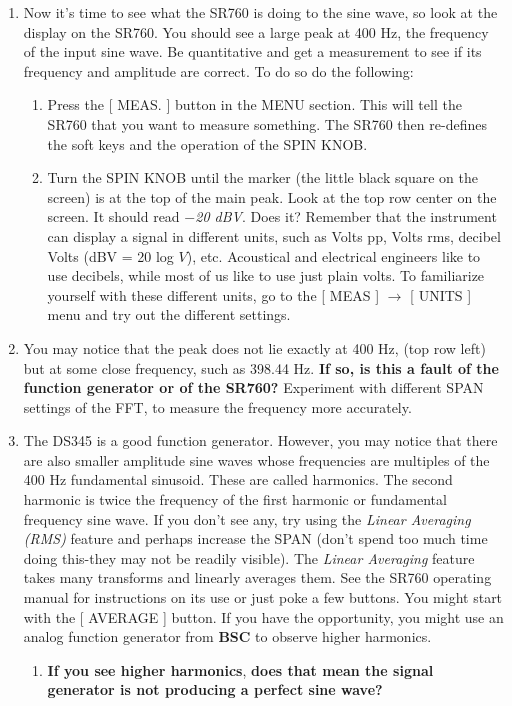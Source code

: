 \documentclass{../lab}
\begin{document}
\begin{enumerate}
\begin{enumerate}
\begin{enumerate}
        \end{enumerate}

    \end{enumerate}

    \item Now it's time to see what the SR760 is doing to the sine wave, so look at the display on the SR760. You should see a large peak at 400 Hz, the frequency of the input sine wave. Be quantitative and get a measurement to see if its frequency and amplitude are correct. To do so do the following:
    \begin{enumerate}
        \item Press the [ MEAS. ] button in the MENU section. This will tell the SR760 that you want to measure something. The SR760 then re-defines the soft keys and the operation of the SPIN KNOB.

        \item Turn the SPIN KNOB until the marker (the little black square on the screen) is at the top of the main peak. Look at the top row center on the screen. It should read \emph{$-$20 dBV}. Does it? Remember that the instrument can display a signal in different units, such as Volts pp, Volts rms, decibel Volts (dBV = 20 log $V$), etc. Acoustical and electrical engineers like to use decibels, while most of us like to use just plain volts. To familiarize yourself with these different units, go to the [ MEAS ] $\rightarrow$ [ UNITS ] menu and try out the different settings.

    \end{enumerate}

    \item You may notice that the peak does not lie exactly at 400 Hz, (top row left) but at some close frequency, such as 398.44 Hz. \textbf{If so, is this a fault of the function generator or of the SR760?} Experiment with different SPAN settings of the FFT, to measure the frequency more accurately.

    \item The DS345 is a good function generator. However, you may notice that there are also smaller amplitude sine waves whose frequencies are multiples of the 400 Hz fundamental sinusoid. These are called harmonics. The second harmonic is twice the frequency of the first harmonic or fundamental frequency sine wave. If you don't see any, try using the \emph{Linear Averaging (RMS)} feature and perhaps increase the SPAN (don't spend too much time doing this-they may not be readily visible). The \emph{Linear Averaging} feature takes many transforms and linearly averages them. See the SR760 operating manual for instructions on its use or just poke a few buttons. You might start with the [ AVERAGE ] button. If you have the opportunity, you might use an analog function generator from \textbf{BSC} to observe higher harmonics.
    \begin{enumerate}
        \item \textbf{If you see higher harmonics}, \textbf{does that mean the signal generator is not producing a perfect sine wave?}


\end{enumerate}
\end{enumerate}
\end{document}

